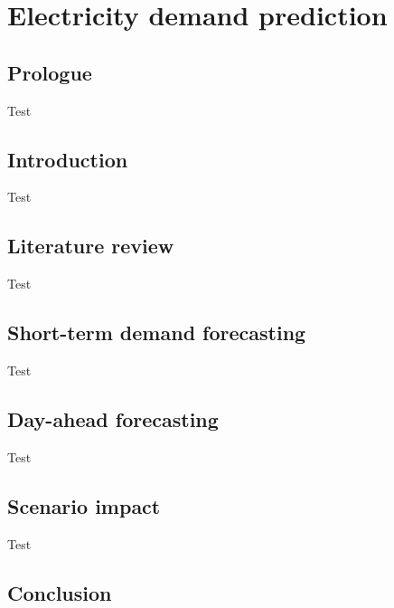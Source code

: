 \chapter{Electricity demand prediction}
\label{chapter:demand}
\ifpdf
    \graphicspath{{Chapter3/Figs/Raster/}{Chapter3/Figs/PDF/}{Chapter3/Figs/}}
\else
    \graphicspath{{Chapter3/Figs/Vector/}{Chapter3/Figs/}}
\fi


\section{Prologue}

Test

\section{Introduction}

Test

\section{Literature review}

Test

\section{Short-term demand forecasting}

Test

\section{Day-ahead forecasting}

Test

\section{Scenario impact}

Test

\section{Conclusion}

